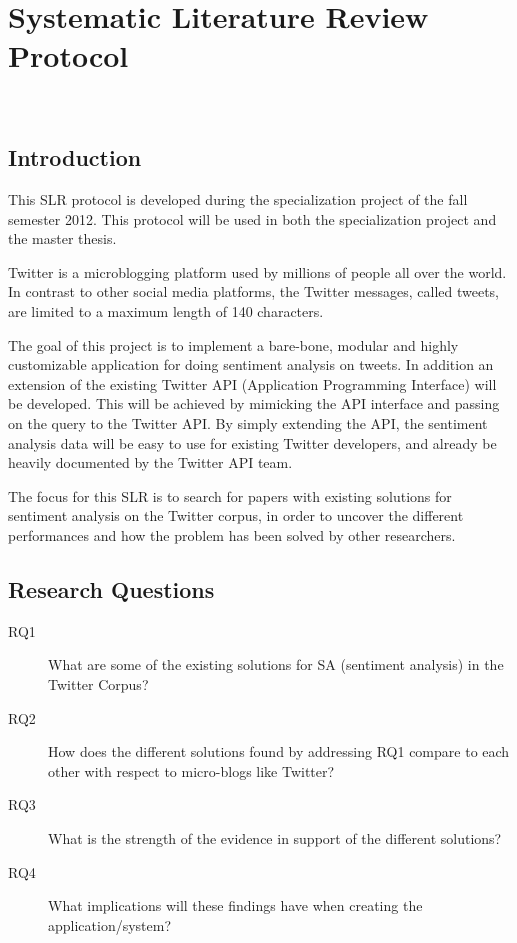 
\chapter{Systematic Literature Review Protocol}~\label{apx:slrp}

\section{Introduction}

This SLR protocol is developed during the specialization project of the fall semester 2012. This protocol will be used in both the specialization project and the master thesis.

Twitter is a microblogging platform used by millions of people all over the world. In contrast to other social media platforms, the Twitter messages, called tweets, are limited to a maximum length of 140 characters.

The goal of this project is to implement a bare-bone, modular and highly customizable application for doing sentiment analysis on tweets. In addition an extension of the existing Twitter API (Application Programming Interface) will be developed. This will be achieved by mimicking the API interface and passing on the query to the Twitter API. By simply extending the API, the sentiment analysis data will be easy to use for existing Twitter developers, and already be heavily documented by the Twitter API team. 

The focus for this SLR is to search for papers with existing solutions for sentiment analysis on the Twitter corpus, in order to uncover the different performances and how the problem has been solved by other researchers.

\section{Research Questions}

\begin{description}

\item[RQ1] What are some of the existing solutions for SA (sentiment analysis) in the Twitter Corpus?
\item[RQ2] How does the different solutions found by addressing RQ1 compare to each other with respect to micro-blogs like Twitter?
\item[RQ3] What is the strength of the evidence in support of the different solutions?
\item[RQ4] What implications will these findings have when creating the application/system?

\end{description}

